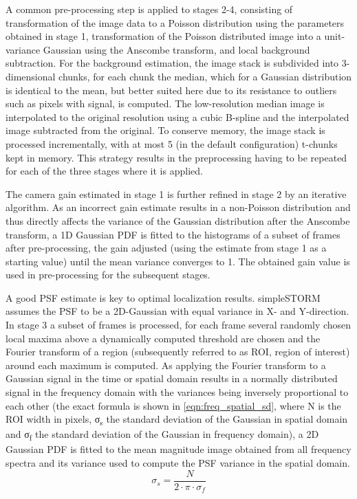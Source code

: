 \documentclass[a4paper,12pt,notitlepage]{report}
\begin{document}
A common pre-processing step is applied to stages 2-4, consisting of transformation of the image data to a Poisson distribution using the parameters obtained in stage 1, transformation of the Poisson distributed image into a unit-variance Gaussian using the Anscombe transform\citep{jstor2332343}, and local background subtraction. For the background estimation, the image stack is subdivided into 3-dimensional chunks, for each chunk the median, which for a Gaussian distribution is identical to the mean, but better suited here due to its resistance to outliers such as pixels with signal, is computed. The low-resolution median image is interpolated to the original resolution using a cubic B-spline and the interpolated image subtracted from the original. To conserve memory, the image stack is processed incrementally, with at most 5 (in the default configuration) t-chunks kept in memory. This strategy results in the preprocessing having to be repeated for each of the three stages where it is applied.

The camera gain estimated in stage 1 is further refined in stage 2 by an iterative algorithm. As an incorrect gain estimate results in a non-Poisson distribution and thus directly affects the variance of the Gaussian distribution after the Anscombe transform, a 1D Gaussian PDF is fitted to the histograms of a subset of frames after pre-processing, the gain adjusted (using the estimate from stage 1 as a starting value) until the mean variance converges to 1. The obtained gain value is used in pre-processing for the subsequent stages.

A good PSF estimate is key to optimal localization results. simpleSTORM assumes the PSF to be a 2D-Gaussian with equal variance in X- and Y-direction. In stage 3 a subset of frames is processed, for each frame several randomly chosen local maxima above a dynamically computed threshold are chosen and the Fourier transform of a region (subsequently referred to as ROI, region of interest) around each maximum is computed. As applying the Fourier transform to a Gaussian signal in the time or spatial domain results in a normally distributed signal in the frequency domain with the variances being inversely proportional to each other (the exact formula is shown in \autoref{eqn:freq_spatial_sd}, where N is the ROI width in pixels, σ\textsubscript{s} the standard deviation of the Gaussian in spatial domain and σ\textsubscript{f} the standard deviation of the Gaussian in frequency domain), a 2D Gaussian PDF is fitted to the mean magnitude image obtained from all frequency spectra and its variance used to compute the PSF variance in the spatial domain.
\begin{equation}
    \sigma_s = \frac{N}{2 \cdot \pi \cdot \sigma_f}
    \label{eqn:freq_spatial_sd}
\end{equation}
\end{document}
